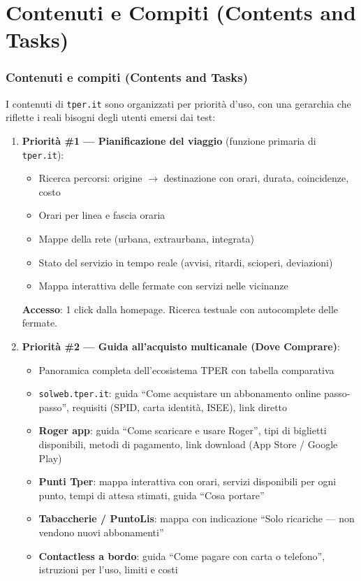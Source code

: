 \section{Contenuti e Compiti (Contents and Tasks)}

\begin{tcolorbox}[colback=backgroundColor,colframe=borderColor,arc=2mm]
{\small

\subsubsection{Contenuti e compiti (Contents and Tasks)}

I contenuti di \texttt{tper.it} sono organizzati per priorità d'uso, con una gerarchia che riflette i reali bisogni degli utenti emersi dai test:

\begin{enumerate}[leftmargin=*]

 \item \textbf{Priorità \#1 --- Pianificazione del viaggio} (funzione primaria di \texttt{tper.it}):
 \begin{itemize}
   \item Ricerca percorsi: origine $\rightarrow$ destinazione con orari, durata, coincidenze, costo
   \item Orari per linea e fascia oraria
   \item Mappe della rete (urbana, extraurbana, integrata)
   \item Stato del servizio in tempo reale (avvisi, ritardi, scioperi, deviazioni)
   \item Mappa interattiva delle fermate con servizi nelle vicinanze
 \end{itemize}
 \textbf{Accesso}: 1 click dalla homepage. Ricerca testuale con autocomplete delle fermate.

 \item \textbf{Priorità \#2 --- Guida all'acquisto multicanale (Dove Comprare)}:
 \begin{itemize}
   \item Panoramica completa dell'ecosistema TPER con tabella comparativa
   \item \texttt{solweb.tper.it}: guida ``Come acquistare un abbonamento online passo-passo'', requisiti (SPID, carta identità, ISEE), link diretto
   \item \textbf{Roger app}: guida ``Come scaricare e usare Roger'', tipi di biglietti disponibili, metodi di pagamento, link download (App Store / Google Play)
   \item \textbf{Punti Tper}: mappa interattiva con orari, servizi disponibili per ogni punto, tempi di attesa stimati, guida ``Cosa portare''
   \item \textbf{Tabaccherie / PuntoLis}: mappa con indicazione ``Solo ricariche --- non vendono nuovi abbonamenti''
   \item \textbf{Contactless a bordo}: guida ``Come pagare con carta o telefono'', istruzioni per l'uso, limiti e costi
 \end{itemize}


\end{enumerate}}
\end{tcolorbox}
